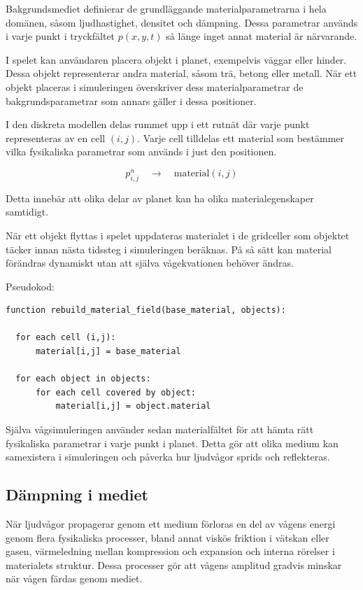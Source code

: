 \documentclass[11pt,a4paper]{article}
\begin{document}
Bakgrundsmediet definierar de grundläggande materialparametrarna
i hela domänen, såsom ljudhastighet, densitet och dämpning.
Dessa parametrar används i varje punkt i tryckfältet
$p(x,y,t)$ så länge inget annat material är närvarande.

I spelet kan användaren placera objekt i planet, exempelvis
väggar eller hinder. Dessa objekt representerar andra material,
såsom trä, betong eller metall. När ett objekt placeras i
simuleringen överskriver dess materialparametrar de
bakgrundsparametrar som annars gäller i dessa positioner.

I den diskreta modellen delas rummet upp i ett rutnät där varje
punkt representeras av en cell $(i,j)$. Varje cell tilldelas ett
material som bestämmer vilka fysikaliska parametrar som används
i just den positionen.

\[
p_{i,j}^n \quad \rightarrow \quad \text{material}(i,j)
\]

Detta innebär att olika delar av planet kan ha olika
materialegenskaper samtidigt.

När ett objekt flyttas i spelet uppdateras materialet i de
gridceller som objektet täcker innan nästa tidssteg i
simuleringen beräknas. På så sätt kan material förändras
dynamiskt utan att själva vågekvationen behöver ändras.

Pseudokod:
\begin{lstlisting}[style=pseudocode]
function rebuild_material_field(base_material, objects):

  for each cell (i,j):
      material[i,j] = base_material

  for each object in objects:
      for each cell covered by object:
          material[i,j] = object.material
\end{lstlisting}

Själva vågsimuleringen använder sedan materialfältet för att
hämta rätt fysikaliska parametrar i varje punkt i planet.
Detta gör att olika medium kan samexistera i simuleringen
och påverka hur ljudvågor sprids och reflekteras.


\subsection{Dämpning i mediet}
När ljudvågor propagerar genom ett medium förloras en del av
vågens energi genom flera fysikaliska processer, bland annat
viskös friktion i vätskan eller gasen, värmeledning mellan 
kompression och expansion och interna rörelser i materialets 
struktur. Dessa processer gör att vågens amplitud gradvis 
minskar när vågen färdas genom mediet.
\end{document}
